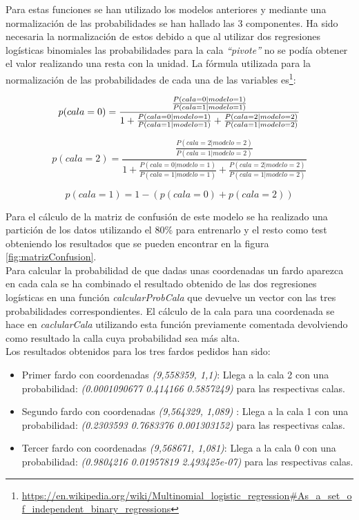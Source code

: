 \documentclass{article}
\begin{document}
Para estas funciones se han utilizado los modelos anteriores y mediante una normalización de las probabilidades se han hallado las 3 componentes. Ha sido necesaria la normalización de estos debido a que al utilizar dos regresiones logísticas binomiales las probabilidades para la cala \textit{``pivote''} no se podía obtener el valor realizando una resta con la unidad. La fórmula utilizada para la normalización de las probabilidades de cada una de las variables es\footnote{\url{https://en.wikipedia.org/wiki/Multinomial_logistic_regression#As_a_set_of_independent_binary_regressions}}:

\begin{equation}
    p(cala = 0) = \frac{\frac{P(cala = 0 | modelo = 1)}{P(cala = 1 | modelo = 1)}}{1 + \frac{P(cala = 0 | modelo = 1)}{P(cala = 1 | modelo = 1)} + \frac{P(cala = 2 | modelo = 2)}{P(cala = 1 | modelo = 2)}}\\
\end{equation}

\begin{equation}
    p(cala = 2) = \frac{\frac{P(cala = 2 | modelo = 2)}{P(cala = 1 | modelo = 2)}}{1 + \frac{P(cala = 0 | modelo = 1)}{P(cala = 1 | modelo = 1)} + \frac{P(cala = 2 | modelo = 2)}{P(cala = 1 | modelo = 2)}}
\end{equation}

\begin{equation}
    p(cala = 1) = 1 - (p(cala = 0) + p(cala = 2))
\end{equation}

Para el cálculo de la matriz de confusión de este modelo se ha realizado una partición de los datos utilizando el 80\% para entrenarlo y el resto como test obteniendo los resultados que se pueden encontrar en la figura \ref{fig:matrizConfusion}.\\
Para calcular la probabilidad de que dadas unas coordenadas un fardo aparezca en cada cala se ha combinado el resultado obtenido de las dos regresiones logísticas en una función \textit{calcularProbCala} que devuelve un vector con las tres probabilidades correspondientes. El cálculo de la cala para una coordenada se hace en \textit{caclularCala} utilizando esta función previamente comentada devolviendo como resultado la calla cuya probabilidad sea más alta.\\

Los resultados obtenidos para los tres fardos pedidos han sido:
\begin{itemize}
    \item Primer fardo con coordenadas \textit{(9,558359, 1,1)}: Llega a la cala 2 con una probabilidad: \textit{(0.0001090677 0.414166 0.5857249)} para las respectivas calas.
    \item Segundo fardo con coordenadas \textit{(9,564329, 1,089) }: Llega a la cala 1 con una probabilidad: \textit{(0.2303593 0.7683376 0.001303152)}  para las respectivas calas.
    \item Tercer fardo con coordenadas \textit{(9,568671, 1,081)}: Llega a la cala 0 con una probabilidad: \textit{(0.9804216 0.01957819 2.493425e-07)}  para las respectivas calas.
\end{itemize}
\end{document}
